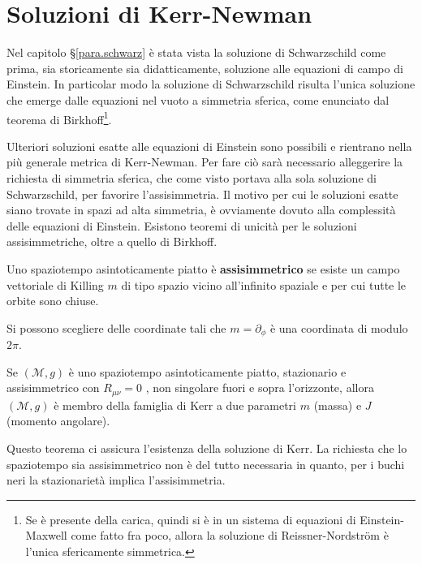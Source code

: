 \chapter{Soluzioni di Kerr-Newman}
Nel capitolo \S\ref{para.schwarz} è stata vista la soluzione di Schwarzschild come prima, sia storicamente sia didatticamente, soluzione alle equazioni di campo di Einstein. In particolar modo la soluzione di Schwarzschild risulta l'unica soluzione che emerge dalle equazioni nel vuoto a simmetria sferica, come enunciato dal teorema di Birkhoff\footnote{Se è presente della carica, quindi si è in un sistema di equazioni di Einstein-Maxwell come fatto fra poco, allora la soluzione di Reissner-Nordstr\"om è l'unica sfericamente simmetrica.}.

Ulteriori soluzioni esatte alle equazioni di Einstein sono possibili e rientrano nella più generale metrica di Kerr-Newman. Per fare ciò sarà necessario alleggerire la richiesta di simmetria sferica, che come visto portava alla sola soluzione di Schwarzschild, per favorire l'assisimmetria. Il motivo per cui le soluzioni esatte siano trovate in spazi ad alta simmetria, è ovviamente dovuto alla complessità delle equazioni di Einstein.
Esistono teoremi di unicità per le soluzioni assisimmetriche, oltre a quello di Birkhoff.

\begin{definizione}
Uno spaziotempo asintoticamente piatto è \textbf{assisimmetrico} se esiste un campo vettoriale di Killing $m$ di tipo spazio vicino all'infinito spaziale e per cui tutte le orbite sono chiuse.

Si possono scegliere delle coordinate tali che $m = \partial_\phi$ è una coordinata di modulo $2\pi$.
\end{definizione}
\begin{teorema}
Se $(\mathcal{M},g)$ è uno spaziotempo asintoticamente piatto, stazionario e assisimmetrico con $R_{\mu\nu} =0$ , non singolare fuori e sopra l'orizzonte, allora $(\mathcal{M}, g)$  è membro della famiglia di Kerr a due parametri $m$ (massa) e $J$ (momento angolare).
\end{teorema}

Questo teorema ci assicura l'esistenza della soluzione di Kerr.
La richiesta che lo spaziotempo sia assisimmetrico non è del tutto necessaria in quanto, per i buchi neri la stazionarietà implica l'assisimmetria.

